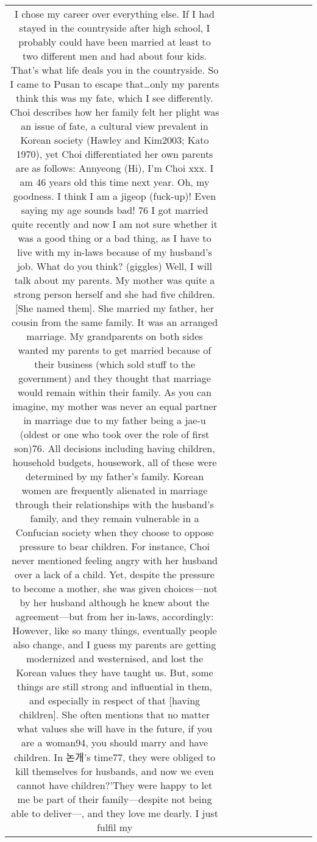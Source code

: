 \begin{table}[h!]
\begin{tabular}{|c|c|c|c|c|c|c|c|c|c|}
{I chose my career over everything else. If I had stayed in the countryside after high school, I probably could have been married at least to two different men and had about four kids. That’s what life deals you in the countryside. So I came to Pusan to escape that…only my parents think this was my fate, which I see differently.
Choi describes how her family felt her plight was an issue of fate, a cultural view prevalent in Korean society (Hawley and Kim2003; Kato 1970), yet Choi differentiated her own parents are as follows:
Annyeong (Hi), I'm Choi xxx. I am 46 years old this time next year. Oh, my
goodness. I think I am a jigeop (fuck-up)! Even saying my age sounds bad! 76 I got
married quite recently and now I am not sure whether it was a good thing or a bad
thing, as I have to live with my in-laws because of my husband’s job. What do you
think? (giggles)
Well, I will talk about my parents. My mother was quite a strong person herself and
she had five children. [She named them]. She married my father, her cousin from
the same family. It was an arranged marriage. My grandparents on both sides
wanted my parents to get married because of their business (which sold stuff to the
government) and they thought that marriage would remain within their family. As
you can imagine, my mother was never an equal partner in marriage due to my
father being a jae-u (oldest or one who took over the role of first son)76. All
decisions including having children, household budgets, housework, all of these
were determined by my father’s family.
Korean women are frequently alienated in marriage through their relationships with the husband’s family, and they remain vulnerable in a Confucian society when they choose to oppose pressure to bear children. For instance, Choi never mentioned feeling angry with her husband over a lack of a child. Yet, despite the pressure to become a mother, she was given choices—not by her husband although he knew about the agreement—but from her in-laws, accordingly:
However, like so many things, eventually people also change, and I guess my
parents are getting modernized and westernised, and lost the Korean values they
have taught us. But, some things are still strong and influential in them, and
especially in respect of that [having children]. She often mentions that no matter
what values she will have in the future, if you are a woman94, you should marry and
have children. In 논개's time77, they were obliged to kill themselves for husbands,
and now we even cannot have children?’They were happy to let me be part of their
family—despite not being able to deliver—, and they love me dearly. I just fulfil my
}
\end{tabular}
\end{table}
